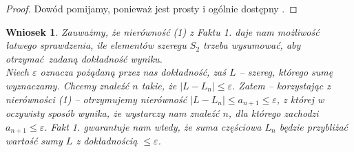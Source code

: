 \documentclass{article}
\newtheorem{wniosek}{Wniosek}
\begin{document}
\begin{proof}
Dowód pomijamy, ponieważ jest prosty i ogólnie dostępny \cite{leibniz}. 
\end{proof}

\begin{wniosek}
\indent Zauważmy, że nierówność (1) z Faktu 1. daje nam możliwość łatwego sprawdzenia, ile elementów szeregu $S_{2}$ trzeba wysumować,
aby otrzymać zadaną dokładność wyniku. \\
\indent Niech $\varepsilon$ oznacza pożądaną przez nas dokładność, zaś $L$ -- szereg, którego sumę wyznaczamy.
Chcemy znaleźć $n$ takie, że $|L - L_n| \leqslant \varepsilon$.
Zatem -- korzystając z nierówności (1) -- otrzymujemy nierówność $|L - L_n| \leqslant a_{n+1} \leqslant \varepsilon$, z której w oczywisty sposób wynika,
że wystarczy nam znaleźć $n$, dla którego zachodzi $ a_{n+1} \leqslant \varepsilon $. Fakt 1. gwarantuje nam wtedy, że suma częściowa $L_n$
będzie przybliżać wartość sumy $L$ z dokładnością $\leqslant \varepsilon$.
\end{wniosek}
\end{document}
